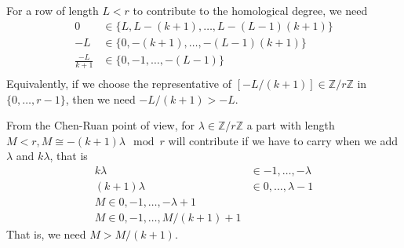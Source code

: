 \documentclass{amsart}
\begin{document}
For a row of length $L<r$ to contribute to the homological degree, we need 
\begin{align*}
0 &\in \{L, L-(k+1),\dots, L-(L-1)(k+1) \} \\
-L &\in \{0, -(k+1),\dots,-(L-1)(k+1) \} \\
\frac{-L}{k+1} &\in \{0, -1, \dots, -(L-1) \} \\
\end{align*}
Equivalently, if we choose the representative of $[-L/(k+1)]\in \mathbb{Z}/r\mathbb{Z}$ in $\{0,\dots, r-1\}$, then we need $-L/(k+1)>-L$.

From the Chen-Ruan point of view, for $\lambda \in \mathbb{Z}/r\mathbb{Z}$ a part with length $M<r, M\cong-(k+1)\lambda\mod r$ will contribute if we have to carry when we add $\lambda $ and $k\lambda$, that is
\begin{align*}
k \lambda &\in -1,\dots, -\lambda \\
(k+1)\lambda &\in 0,\dots, \lambda-1 \\
M\in 0,-1,\dots, -\lambda+1 \\
M \in 0, -1,\dots, M/(k+1)+1
\end{align*}
That is, we need $M>M/(k+1)$.
\end{document}
